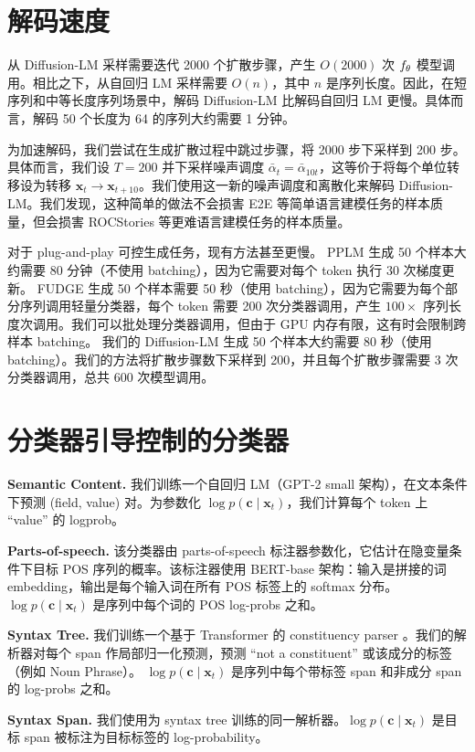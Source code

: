 \documentclass{article}
\newcommand{\expmb}[1]{\mathbf{#1}}
\newcommand{\alphabar}{\bar{\alpha}}
\newcommand{\cc}{\expmb{c}}
\newcommand{\cx}[1]{\mathbf{x}_{#1}}
\begin{document}
\section{解码速度}
从 Diffusion-LM 采样需要迭代 2000 个扩散步骤，产生 $O(2000)$ 次 $f_\theta$ 模型调用。相比之下，从自回归 LM 采样需要 $O(n)$，其中 $n$ 是序列长度。因此，在短序列和中等长度序列场景中，解码 Diffusion-LM 比解码自回归 LM 更慢。具体而言，解码 50 个长度为 64 的序列大约需要 1 分钟。

为加速解码，我们尝试在生成扩散过程中跳过步骤，将 2000 步下采样到 200 步。具体而言，我们设 $T=200$ 并下采样噪声调度 $\alphabar_{t} = \alphabar_{10t}$，这等价于将每个单位转移设为转移 $\cx{t} \rightarrow \cx{t+10}$。我们使用这一新的噪声调度和离散化来解码 Diffusion-LM。我们发现，这种简单的做法不会损害 E2E 等简单语言建模任务的样本质量，但会损害 ROCStories 等更难语言建模任务的样本质量。

对于 plug-and-play 可控生成任务，现有方法甚至更慢。
PPLM 生成 50 个样本大约需要 80 分钟（不使用 batching），因为它需要对每个 token 执行 30 次梯度更新。
FUDGE 生成 50 个样本需要 50 秒（使用 batching），因为它需要为每个部分序列调用轻量分类器，每个 token 需要 200 次分类器调用，产生 $100 \times$ 序列长度次调用。我们可以批处理分类器调用，但由于 GPU 内存有限，这有时会限制跨样本 batching。
我们的 Diffusion-LM 生成 50 个样本大约需要 80 秒（使用 batching）。我们的方法将扩散步骤数下采样到 200，并且每个扩散步骤需要 3 次分类器调用，总共 600 次模型调用。

\section{分类器引导控制的分类器}
\textbf{Semantic Content.} 我们训练一个自回归 LM（GPT-2 small 架构），在文本条件下预测 (field, value) 对。为参数化 $\log p(\cc \mid \cx{t})$，我们计算每个 token 上 ``value'' 的 logprob。


\textbf{Parts-of-speech.} 该分类器由 parts-of-speech 标注器参数化，它估计在隐变量条件下目标 POS 序列的概率。该标注器使用 BERT-base 架构：输入是拼接的词 embedding，输出是每个输入词在所有 POS 标签上的 softmax 分布。$\log p(\cc \mid  \cx{t})$ 是序列中每个词的 POS log-probs 之和。

\textbf{Syntax Tree.} 我们训练一个基于 Transformer 的 constituency parser \cite{kitaev-klein-2018-constituency}。我们的解析器对每个 span 作局部归一化预测，预测 ``not a constituent'' 或该成分的标签（例如 Noun Phrase）。
$\log p(\cc \mid  \cx{t})$ 是序列中每个带标签 span 和非成分 span 的 log-probs 之和。


\textbf{Syntax Span.} 我们使用为 syntax tree 训练的同一解析器。$\log p(\cc \mid  \cx{t})$ 是目标 span 被标注为目标标签的 log-probability。
\end{document}
